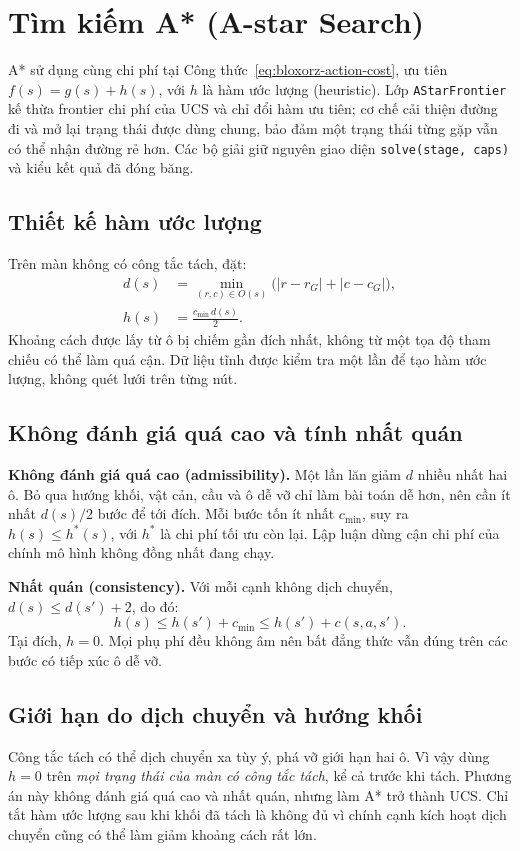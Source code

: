 \section{Tìm kiếm A* (A-star Search)}
\label{sec:bloxorz-astar}

A* sử dụng cùng chi phí tại Công thức~\eqref{eq:bloxorz-action-cost}, ưu tiên
$f(s)=g(s)+h(s)$, với $h$ là hàm ước lượng (heuristic). Lớp \texttt{AStarFrontier} kế thừa frontier chi phí của UCS và chỉ đổi
hàm ưu tiên; cơ chế cải thiện đường đi và mở lại trạng thái được dùng chung, bảo đảm một trạng thái từng gặp vẫn có thể
nhận đường rẻ hơn. Các bộ giải giữ nguyên giao diện
\texttt{solve(stage, caps)} và kiểu kết quả đã đóng băng.

\subsection{Thiết kế hàm ước lượng}
Trên màn không có công tắc tách, đặt:
\begin{align}
  d(s)&=\min_{(r,c)\in O(s)}\bigl(|r-r_G|+|c-c_G|\bigr),\\
  h(s)&=\frac{c_{\min}\,d(s)}{2}.
  \label{eq:bloxorz-heuristic}
\end{align}
Khoảng cách được lấy từ ô bị chiếm gần đích nhất, không từ một tọa độ tham
chiếu có thể làm quá cận. Dữ liệu tĩnh được kiểm tra một lần để tạo hàm ước
lượng, không quét lưới trên từng nút.

\subsection{Không đánh giá quá cao và tính nhất quán}
\textbf{Không đánh giá quá cao (admissibility).}
Một lần lăn giảm $d$ nhiều nhất hai ô. Bỏ qua hướng khối, vật cản, cầu và ô dễ
vỡ chỉ làm bài toán dễ hơn, nên cần ít nhất $d(s)/2$ bước để tới đích. Mỗi bước
tốn ít nhất $c_{\min}$, suy ra $h(s)\leq h^*(s)$, với $h^*$ là chi phí tối ưu
còn lại. Lập luận dùng cận chi phí của chính mô hình không đồng nhất đang chạy.

\textbf{Nhất quán (consistency).}
Với mỗi cạnh không dịch chuyển, $d(s)\leq d(s')+2$, do đó:
\begin{equation}
  h(s)\leq h(s')+c_{\min}\leq h(s')+c(s,a,s').
\end{equation}
Tại đích, $h=0$. Mọi phụ phí đều không âm nên bất đẳng thức vẫn đúng trên
các bước có tiếp xúc ô dễ vỡ.

\subsection{Giới hạn do dịch chuyển và hướng khối}
Công tắc tách có thể dịch chuyển xa tùy ý, phá vỡ giới hạn hai ô. Vì vậy dùng
$h=0$ trên \emph{mọi trạng thái của màn có công tắc tách}, kể cả trước khi tách.
Phương án này không đánh giá quá cao và nhất quán, nhưng làm A* trở thành UCS.
Chỉ tắt hàm ước lượng sau khi khối đã tách là không đủ vì chính cạnh kích hoạt
dịch chuyển cũng có thể làm giảm khoảng cách rất lớn.

